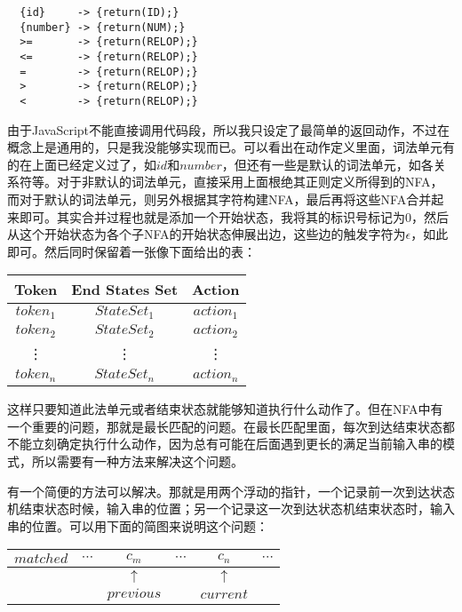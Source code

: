 \begin{verbatim}
  {id}     -> {return(ID);}
  {number} -> {return(NUM);}
  >=       -> {return(RELOP);}
  <=       -> {return(RELOP);}
  =        -> {return(RELOP);}
  >        -> {return(RELOP);}
  <        -> {return(RELOP);}
\end{verbatim}

由于JavaScript不能直接调用代码段，所以我只设定了最简单的返回动作，不过在概念上是通用的，只是我没能够实现而已。可以看出在动作定义里面，词法单元有的在上面已经定义过了，如$id$和$number$，但还有一些是默认的词法单元，如各关系符等。对于非默认的词法单元，直接采用上面根绝其正则定义所得到的NFA，而对于默认的词法单元，则另外根据其字符构建NFA，最后再将这些NFA合并起来即可。其实合并过程也就是添加一个开始状态，我将其的标识号标记为$0$，然后从这个开始状态为各个子NFA的开始状态伸展出边，这些边的触发字符为$\epsilon$，如此即可。然后同时保留着一张像下面给出的表：

\begin{center}
\begin{tabular}{c|c|c}
    \bf{Token} & \bf{End States Set} & \bf{Action} \\ \hline
    $token_1$  & $StateSet_1$        & $action_1$  \\
    $token_2$  & $StateSet_2$        & $action_2$  \\
    \vdots     & \vdots              & \vdots      \\
    $token_n$  & $StateSet_n$        & $action_n$  \\
\end{tabular}
\end{center}

这样只要知道此法单元或者结束状态就能够知道执行什么动作了。但在NFA中有一个重要的问题，那就是最长匹配的问题。在最长匹配里面，每次到达结束状态都不能立刻确定执行什么动作，因为总有可能在后面遇到更长的满足当前输入串的模式，所以需要有一种方法来解决这个问题。

有一个简便的方法可以解决。那就是用两个浮动的指针，一个记录前一次到达状态机结束状态时候，输入串的位置；另一个记录这一次到达状态机结束状态时，输入串的位置。可以用下面的简图来说明这个问题：

\begin{center}
\begin{tabular}{cccccc}
    \hline
    $matched$ \vline & $\cdots$ & \vline $c_m$ \vline & $\cdots$ & \vline $c_n$ \vline & $\cdots$ \\
    \hline
           &  & $\uparrow$ &          & $\uparrow$ &          \\
           &  & $previous$ &          & $current$ &          \\
\end{tabular}
\end{center}

